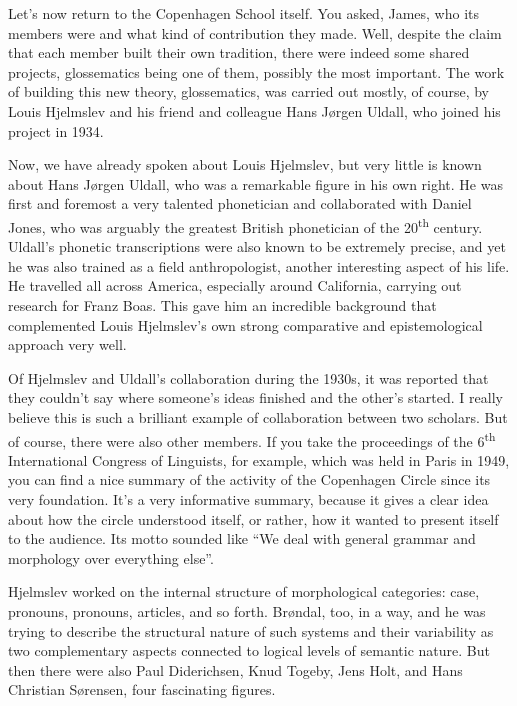\begin{styleStandard}
Let’s now return to the Copenhagen School itself. You asked, James, who its members were and what kind of contribution they made. Well, despite the claim that each member built their own tradition, there were indeed some shared projects, glossematics being one of them, possibly the most important. The work of building this new theory, glossematics, was carried out mostly, of course, by Louis Hjelmslev and his friend and colleague Hans Jørgen Uldall, who joined his project in 1934. 
\end{styleStandard}

\begin{styleStandard}
Now, we have already spoken about Louis Hjelmslev, but very little is known about Hans Jørgen Uldall, who was a remarkable figure in his own right. He was first and foremost a very talented phonetician and collaborated with Daniel Jones, who was arguably the greatest British phonetician of the 20\textsuperscript{th} century. Uldall’s phonetic transcriptions were also known to be extremely precise, and yet he was also trained as a field anthropologist, another interesting aspect of his life. He travelled all across America, especially around California, carrying out research for Franz Boas. This gave him an incredible background that complemented Louis Hjelmslev’s own strong comparative and epistemological approach very well. 
\end{styleStandard}

\begin{styleStandard}
Of Hjelmslev and Uldall’s collaboration during the 1930s, it was reported that they couldn’t say where someone’s ideas finished and the other’s started. I really believe this is such a brilliant example of collaboration between two scholars. But of course, there were also other members. If you take the proceedings of the 6\textsuperscript{th} International Congress of Linguists, for example, which was held in Paris in 1949, you can find a nice summary of the activity of the Copenhagen Circle since its very foundation. It’s a very informative summary, because it gives a clear idea about how the circle understood itself, or rather, how it wanted to present itself to the audience. Its motto sounded like “We deal with general grammar and morphology over everything else”.
\end{styleStandard}

\begin{styleStandard}
Hjelmslev worked on the internal structure of morphological categories: case, pronouns, pronouns, articles, and so forth. Brøndal, too, in a way, and he was trying to describe the structural nature of such systems and their variability as two complementary aspects connected to logical levels of semantic nature. But then there were also Paul Diderichsen, Knud Togeby, Jens Holt, and Hans Christian Sørensen, four fascinating figures.
\end{styleStandard}

